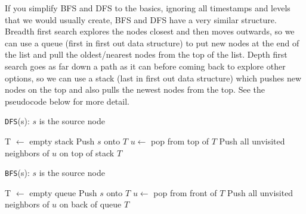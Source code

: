 \documentclass [12pt]{article}
\begin{document}
If you simplify BFS and DFS to the basics, ignoring all timestamps and levels that we would usually create, BFS and DFS have a very similar structure. Breadth first search explores the nodes closest and then moves outwards, so we can use a queue (first in first out data structure) to put new nodes at the end of the list and pull the oldest/nearest nodes from the top of the list. Depth first search goes as far down a path as it can before coming back to explore other options, so we can use a stack (last in first out data structure) which pushes new nodes on the top and also pulls the newest nodes from the top. See the pseudocode below for more detail.

\begin{algorithm}
\caption{\texttt{DFS}(s): $s$ is the source node}
\label{alg:DFS_s}
\begin{algorithmic}
\STATE T $\gets$ empty stack
Push $s$ onto $T$
    \STATE $u \gets$ pop from top of $T$
    \STATE Push all unvisited neighbors of $u$ on top of stack $T$
\ENDWHILE
\end{algorithmic}
\end{algorithm}

\begin{algorithm}
\caption{\texttt{BFS}(s): $s$ is the source node}
\label{alg:BFS_s}
\begin{algorithmic}
\STATE T $\gets$ empty queue
Push $s$ onto $T$
    \STATE $u \gets$ pop from front of $T$
    \STATE Push all unvisited neighbors of $u$ on back of queue $T$
\ENDWHILE
\end{algorithmic}
\end{algorithm}
\end{document}
